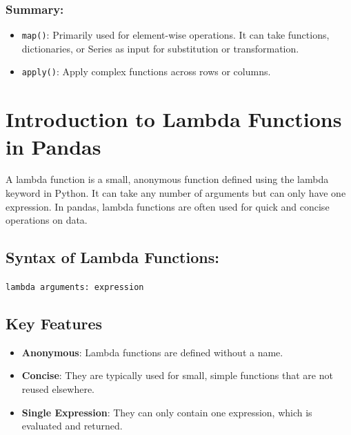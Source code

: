 \documentclass[
  letterpaper,
  DIV=11,
  numbers=noendperiod]{scrreprt}
\providecommand{\tightlist}{%
  \setlength{\itemsep}{0pt}\setlength{\parskip}{0pt}}\usepackage{longtable,booktabs,array}
\begin{document}
\hypertarget{summary}{%
\subsubsection{Summary:}\label{summary}}

\begin{itemize}
\tightlist
\item
  \texttt{map()}: Primarily used for element-wise operations. It can
  take functions, dictionaries, or Series as input for substitution or
  transformation.
\item
  \texttt{apply()}: Apply complex functions across rows or columns.
\end{itemize}

\hypertarget{introduction-to-lambda-functions-in-pandas}{%
\section{Introduction to Lambda Functions in
Pandas}\label{introduction-to-lambda-functions-in-pandas}}

A lambda function is a small, anonymous function defined using the
lambda keyword in Python. It can take any number of arguments but can
only have one expression. In pandas, lambda functions are often used for
quick and concise operations on data.

\hypertarget{syntax-of-lambda-functions}{%
\subsection{Syntax of Lambda
Functions:}\label{syntax-of-lambda-functions}}

\texttt{lambda\ arguments:\ expression}

\hypertarget{key-features}{%
\subsection{Key Features}\label{key-features}}

\begin{itemize}
\tightlist
\item
  \textbf{Anonymous}: Lambda functions are defined without a name.
\item
  \textbf{Concise}: They are typically used for small, simple functions
  that are not reused elsewhere.
\item
  \textbf{Single Expression}: They can only contain one expression,
  which is evaluated and returned.
\end{itemize}
\end{document}
